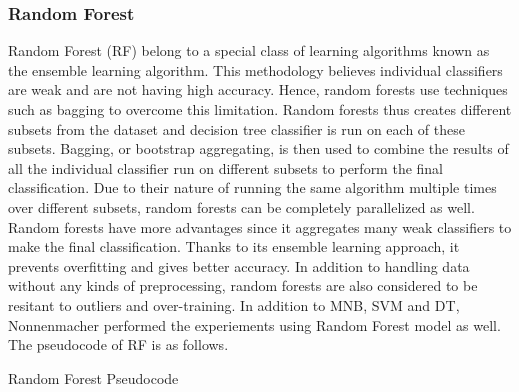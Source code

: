 \documentclass[a4paper,12pt,twoside]{report}
\begin{document}
\subsubsection{Random Forest}
Random Forest (\acs{RF}) belong to a special class of learning algorithms known as the ensemble learning algorithm. This methodology believes individual classifiers are weak and are not having high accuracy. Hence, random forests use techniques such as bagging to overcome this limitation. Random forests thus creates different subsets from the dataset and decision tree classifier is run on each of these subsets. Bagging, or bootstrap aggregating, is then used to combine the results of all the individual classifier run on different subsets to perform the final classification\cite{Jain2017}. 
\newline \newline
Due to their nature of running the same algorithm multiple times over different subsets, random forests can be completely parallelized as well. Random forests have more advantages since it aggregates many weak classifiers to make the final classification. Thanks to its ensemble learning approach, it prevents overfitting and gives better accuracy. In addition to handling data without any kinds of preprocessing, random forests are also considered to be resitant to outliers and over-training\cite{Jain2017}. In addition to \acs{MNB}, \acs{SVM} and \acs{DT}, Nonnenmacher\cite{Nonnenmacher2017} performed the experiements using Random Forest model as well. The pseudocode of \acs{RF} is as follows. 
\begin{algorithm}
\caption{Random Forest Pseudocode}
\begin{algorithmic}[1]
\State {}
	\State {}
	\State {}
   	\State {}
\EndFor
\State {}
\State {}
\EndProcedure
\end{algorithmic}
\end{algorithm}
\end{document}

